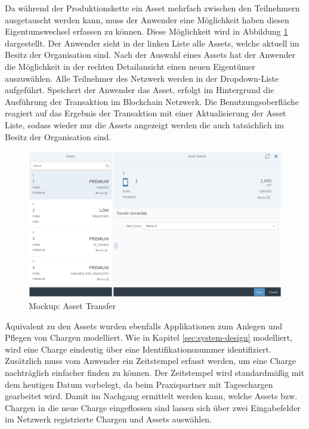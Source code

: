 Da während der Produktionskette ein Asset mehrfach zwischen den Teilnehmern ausgetauscht werden kann, muss der Anwender eine Möglichkeit haben diesen Eigentumswechsel erfassen zu können. Diese Möglichkeit wird in Abbildung \ref{fig:ui-transfer-asset} dargestellt. Der Anwender sieht in der linken Liste alle Assets, welche aktuell im Besitz der Organisation sind. Nach der Auswahl eines Assets hat der Anwender die Möglichkeit in der rechten Detailansicht einen neuen Eigentümer auszuwählen. Alle Teilnehmer des Netzwerk werden in der Dropdown-Liste aufgeführt. Speichert der Anwender das Asset, erfolgt im Hintergrund die Ausführung der Transaktion im Blockchain Netzwerk. Die Benutzungsoberfläche reagiert auf das Ergebnis der Transaktion mit einer Aktualisierung der Asset Liste, sodass wieder nur die Assets angezeigt werden die auch tatsächlich im Besitz der Organisation sind.

\begin{figure}[H]
	\centering
	\includegraphics[width=1\linewidth]{pictures/ui-transfer-asset}
	\caption[Mockup: Asset Transfer]{Mockup: Asset Transfer}
	\label{fig:ui-transfer-asset}
\end{figure}

Äquivalent zu den Assets wurden ebenfalls Applikationen zum Anlegen und Pflegen von Chargen modelliert. Wie in Kapitel \ref{sec:system-design} modelliert, wird eine Charge eindeutig über eine Identifikationsnummer identifiziert. Zusätzlich muss vom Anwender ein Zeitstempel erfasst werden, um eine Charge nachträglich einfacher finden zu können. Der Zeitstempel wird standardmäßig mit dem heutigen Datum vorbelegt, da beim Praxispartner mit Tageschargen gearbeitet wird. Damit im Nachgang ermittelt werden kann, welche Assets bzw. Chargen in die neue Charge eingeflossen sind lassen sich über zwei Eingabefelder im Netzwerk registrierte Chargen und Assets auswählen.

